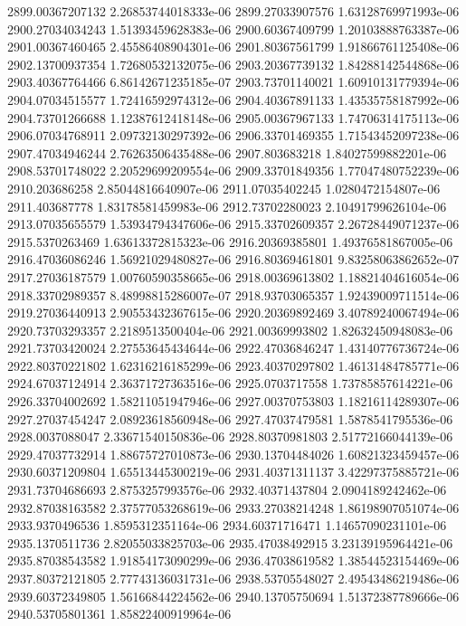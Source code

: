 {2899.00367207132 2.26853744018333e-06
2899.27033907576 1.63128769971993e-06
2900.27034034243 1.51393459628383e-06
2900.60367409799 1.20103888763387e-06
2901.00367460465 2.45586408904301e-06
2901.80367561799 1.91866761125408e-06
2902.13700937354 1.72680532132075e-06
2903.20367739132 1.84288142544868e-06
2903.40367764466 6.86142671235185e-07
2903.73701140021 1.60910131779394e-06
2904.07034515577 1.72416592974312e-06
2904.40367891133 1.43535758187992e-06
2904.73701266688 1.12387612418148e-06
2905.00367967133 1.74706314175113e-06
2906.07034768911 2.09732130297392e-06
2906.33701469355 1.71543452097238e-06
2907.47034946244 2.76263506435488e-06
2907.803683218 1.84027599882201e-06
2908.53701748022 2.20529699209554e-06
2909.33701849356 1.77047480752239e-06
2910.203686258 2.85044816640907e-06
2911.07035402245 1.0280472154807e-06
2911.403687778 1.83178581459983e-06
2912.73702280023 2.10491799626104e-06
2913.07035655579 1.53934794347606e-06
2915.33702609357 2.26728449071237e-06
2915.5370263469 1.63613372815323e-06
2916.20369385801 1.49376581867005e-06
2916.47036086246 1.56921029480827e-06
2916.80369461801 9.83258063862652e-07
2917.27036187579 1.00760590358665e-06
2918.00369613802 1.18821404616054e-06
2918.33702989357 8.48998815286007e-07
2918.93703065357 1.92439009711514e-06
2919.27036440913 2.90553432367615e-06
2920.20369892469 3.40789240067494e-06
2920.73703293357 2.2189513500404e-06
2921.00369993802 1.82632450948083e-06
2921.73703420024 2.27553645434644e-06
2922.47036846247 1.43140776736724e-06
2922.80370221802 1.62316216185299e-06
2923.40370297802 1.46131484785771e-06
2924.67037124914 2.36371727363516e-06
2925.0703717558 1.73785857614221e-06
2926.33704002692 1.58211051947946e-06
2927.00370753803 1.18216114289307e-06
2927.27037454247 2.08923618560948e-06
2927.47037479581 1.5878541795536e-06
2928.0037088047 2.33671540150836e-06
2928.80370981803 2.51772166044139e-06
2929.47037732914 1.88675727010873e-06
2930.13704484026 1.60821323459457e-06
2930.60371209804 1.65513445300219e-06
2931.40371311137 3.42297375885721e-06
2931.73704686693 2.8753257993576e-06
2932.40371437804 2.0904189242462e-06
2932.87038163582 2.37577053268619e-06
2933.27038214248 1.86198907051074e-06
2933.9370496536 1.8595312351164e-06
2934.60371716471 1.14657090231101e-06
2935.1370511736 2.82055033825703e-06
2935.47038492915 3.23139195964421e-06
2935.87038543582 1.91854173090299e-06
2936.47038619582 1.38544523154469e-06
2937.80372121805 2.77743136031731e-06
2938.53705548027 2.49543486219486e-06
2939.60372349805 1.56166844224562e-06
2940.13705750694 1.51372387789666e-06
2940.53705801361 1.85822400919964e-06
}
